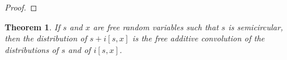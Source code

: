 \documentclass{amsart}
\newtheorem{thm}[claim]{Theorem}
\begin{document}
\begin{proof}
% 
% 

\end{proof}

\begin{thm}
	If $ s $ and $ x $ are free random variables such that $ s $ is semicircular, then the distribution of $ s + i[s, x] $ is the free additive convolution of the distributions of $ s $ and of $i[s, x]$.
\end{thm}
\end{document}
